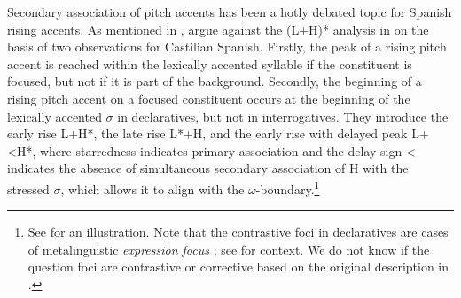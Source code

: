 
Secondary association of pitch accents has been a hotly debated topic for Spanish rising accents. As mentioned in , \citet[129f.]{FacePrieto.2007} argue against the (L+H)* analysis in \citet{Hualde.2002} on the basis of two observations for Castilian Spanish. Firstly, the peak of a rising pitch accent is reached within the lexically accented syllable if the constituent is focused, but not if it is part of the background. Secondly, the beginning of a rising pitch accent on a focused constituent occurs at the beginning of the lexically accented $\sigma$ in declaratives, but not in interrogatives. They introduce the early rise L+H*, the late rise L*+H, and the early rise with delayed peak L+<H*, where starredness indicates primary association and the delay sign < indicates the absence of simultaneous secondary association of H with the stressed $\sigma$, which allows it to align with the $\omega$-boundary.\footnote{See \citet[138]{FacePrieto.2007} for an illustration. Note that the contrastive foci in declaratives are cases of metalinguistic \textit{expression focus} \citep[8]{KrifkaMusan.2012}; see \citet[212]{Face.2001} for context. We do not know if the question foci are contrastive or corrective based on the original description in \citet[298--299]{Face.2006absint}.}
%

